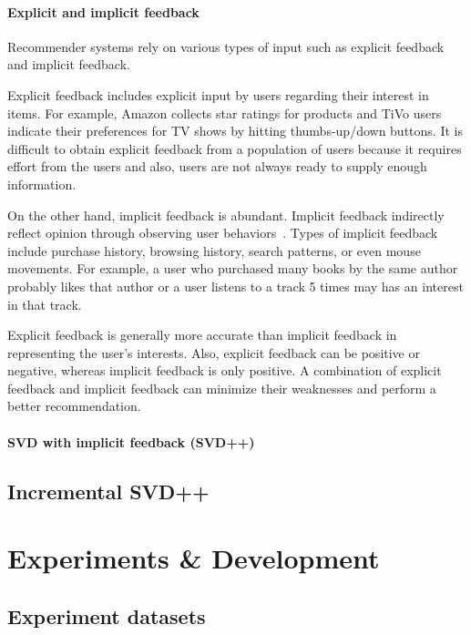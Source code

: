 \documentclass[oneside,13pt]{extreport}
\begin{document}
\subsubsection{Explicit and implicit feedback}
Recommender systems rely on various types of input such as explicit feedback and implicit feedback. 

Explicit feedback includes explicit input by users regarding their interest in items. For example, Amazon collects star ratings for products and TiVo users indicate their
preferences for TV shows by hitting thumbs-up/down buttons. It is difficult to obtain explicit  feedback from a population of users because it requires effort from the users and also, users are not always ready to supply enough information. 

 On the other hand, implicit feedback is abundant. Implicit feedback indirectly reflect opinion through observing user behaviors~\cite{Oard98}. Types of implicit feedback include purchase history, browsing history, search patterns, or even mouse movements. For
example, a user who purchased many books by the same author probably likes that
author or  a user listens to a track 5 times may has an interest in that track.

Explicit feedback is generally more accurate than implicit feedback in representing the user’s interests. Also, explicit feedback can be positive or negative, whereas implicit feedback is only positive. A combination of explicit feedback and implicit feedback can minimize their weaknesses and perform a better recommendation.

\subsubsection{SVD with implicit feedback (SVD++)}

\section{Incremental SVD++}


\chapter{Experiments \& Development}
\label{experiments}

\section{Experiment datasets}
\end{document}

